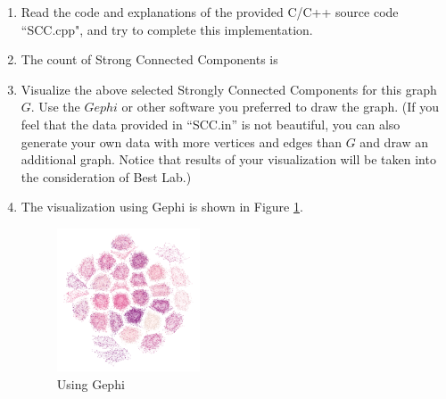 \documentclass[12pt,a4paper]{article}
\makeatletter
\newtheorem*{solution}{Solution}
\theoremstyle{definition}
\renewenvironment{solution}[1][Solution] {\par\pushQED{\qed}\normalfont\topsep6\p@\@plus6\p@\relax\trivlist\item[\hskip\labelsep\bfseries#1\@addpunct{.}]\ignorespaces}{\popQED\endtrivlist\@endpefalse} \makeatother
\makeatother
\begin{document}
\begin{enumerate}
    \begin{enumerate}
    	\item Read the code and explanations of the provided C/C++ source code ``SCC.cpp", and try to complete this implementation.
    	\begin{solution}
            The count of Strong Connected Components is
            \begin{tcolorbox}
                
            \end{tcolorbox}
        \end{solution}
    	\item Visualize the above selected Strongly Connected Components for this graph $G$. Use the $Gephi$ or other software you preferred to draw the graph. {\color{blue}(If you feel that the data provided in ``SCC.in'' is not beautiful, you can also generate your own data with more vertices and edges than $G$ and draw an additional graph. Notice that results of your visualization will be taken into the consideration of Best Lab.)}
    	\begin{solution}
            The visualization using Gephi is shown in Figure \ref{fig:gephi}.
            \begin{figure}[h]
                \centering
                \includegraphics[width=0.4\textwidth]{img/ZilongLi1.png}
                \caption{Using Gephi}
                \label{fig:gephi}
            \end{figure}


\end{solution}
\end{enumerate}
\end{enumerate}
\end{document}

